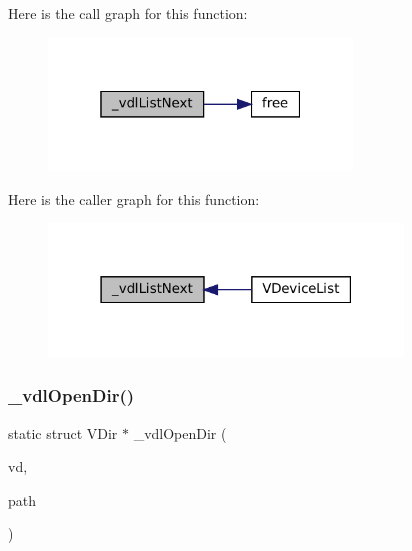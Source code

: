 Here is the call graph for this function\+:
\nopagebreak
\begin{figure}[H]
\begin{center}
\leavevmode
\includegraphics[width=229pt]{vfs-devlist_8c_a2d13d4980fd85b4714d37e3d53a6aff8_cgraph}
\end{center}
\end{figure}
Here is the caller graph for this function\+:
\nopagebreak
\begin{figure}[H]
\begin{center}
\leavevmode
\includegraphics[width=267pt]{vfs-devlist_8c_a2d13d4980fd85b4714d37e3d53a6aff8_icgraph}
\end{center}
\end{figure}
\mbox{\label{vfs-devlist_8c_aaf038c5fba8a9f2f2f8c10b67ee85a2d}} 
\subsubsection{\texorpdfstring{\+\_\+vdl\+Open\+Dir()}{\_vdlOpenDir()}}
{\footnotesize\ttfamily static struct V\+Dir $\ast$ \+\_\+vdl\+Open\+Dir (\begin{DoxyParamCaption}\item[{struct V\+Dir $\ast$}]{vd,  }\item[{const char $\ast$}]{path }\end{DoxyParamCaption})\hspace{0.3cm}{\ttfamily [static]}}

